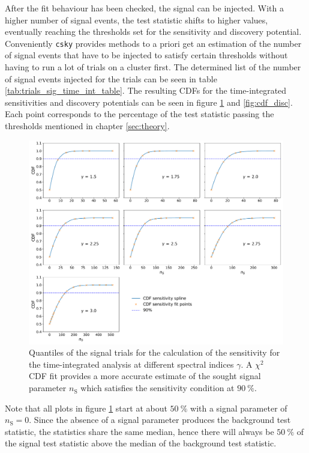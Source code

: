 After the fit behaviour has been checked, the signal can be injected.
With a higher number of signal events, the test statistic shifts to higher values, eventually reaching the thresholds set for the sensitivity and discovery potential.
Conveniently \texttt{csky} provides methods to a priori get an estimation of the number of signal events that have to be injected to satisfy certain thresholds without having to run a lot of trials on a cluster first.
The determined list of the number of signal events injected for the trials can be seen in table \ref{tab:trials_sig_time_int_table}.
The resulting CDFs for the time-integrated sensitivities and discovery potentials can be seen in figure \ref{fig:cdf_sens} and \ref{fig:cdf_disc}.
Each point corresponds to the percentage of the test statistic passing the thresholds mentioned in chapter \ref{sec:theory}.
\begin{figure}[H]
    \centering
    \includegraphics[width=\linewidth]{Plots/05_csky/9_years_gfu_gold_cdf_sens.pdf}
    \caption{Quantiles of the signal trials for the calculation of the sensitivity for the time-integrated analysis at different spectral indices $\gamma$. A $\chi^2$ CDF fit provides a more accurate estimate of the sought signal parameter $n_\text{S}$ which satisfies the sensitivity condition at $\SI{90}{\percent}$.}
    \label{fig:cdf_sens}
\end{figure}
Note that all plots in figure \ref{fig:cdf_sens} start at about $\SI{50}{\percent}$ with a signal parameter of $n_\text{S} = 0$.
Since the absence of a signal parameter produces the background test statistic, the statistics share the same median, hence there will always be $\SI{50}{\percent}$ of the signal test statistic above the median of the background test statistic.
